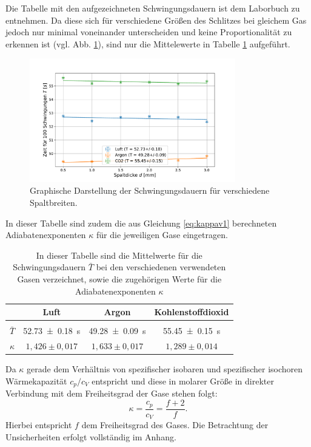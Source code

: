 		Die Tabelle mit den aufgezeichneten Schwingungsdauern ist dem Laborbuch zu entnehmen.
		Da diese sich für verschiedene Größen des Schlitzes bei gleichem Gas jedoch nur minimal voneinander unterscheiden und keine Proportionalität zu erkennen ist (vgl. Abb. \ref{fig:T/d}), sind nur die Mittelewerte in Tabelle \ref{tab:Werte1} aufgeführt.
		\begin{figure}[ht]
			\centering
			\includegraphics[width=0.8\textwidth]{data/linearisierungen.pdf}
			\caption{Graphische Darstellung der Schwingungsdauern für verschiedene Spaltbreiten.}
			\label{fig:T/d}	
		\end{figure}
		In dieser Tabelle sind zudem die aus Gleichung \ref{eq:kappav1} berechneten Adiabatenexponenten $\kappa$ für die jeweiligen Gase eingetragen.
		\begin{table}
			\caption{In dieser Tabelle sind die Mittelwerte für die Schwingungsdauern $\bar{T}$ bei den verschiedenen verwendeten Gasen verzeichnet, sowie die zugehörigen Werte für die Adiabatenexponenten $\kappa$}
			\label{tab:Werte1}
			\centering
			\begin{tabular}{c|c|c|c}					
				& Luft & Argon & Kohlenstoffdioxid\\
				\hline
				&&&\\ %
				$\bar{T}$ & \SI{52,73+-0,18}{\second} & \SI{49,28+-0,09}{\second} & \SI{55,45+-0,15}{\second} \\
				$\kappa$ & $1,426\pm 0,017$ & $1,633\pm 0,017$ & $1,289\pm 0,014$\\
			\end{tabular}
		\end{table} 
		Da $\kappa$ gerade dem Verhältnis von spezifischer isobaren und spezifischer isochoren Wärmekapazität $c_p/c_V$ entspricht und diese in molarer Größe in direkter Verbindung mit dem Freiheitsgrad der Gase stehen folgt:
		\begin{equation} \label{eq:Freiheit}
			\kappa = \frac{c_p}{c_V} = \frac{f+2}{f}.
		\end{equation}
		Hierbei entspricht $f$ dem Freiheitsgrad des Gases.
		Die Betrachtung der Unsicherheiten erfolgt vollständig im Anhang.
		
